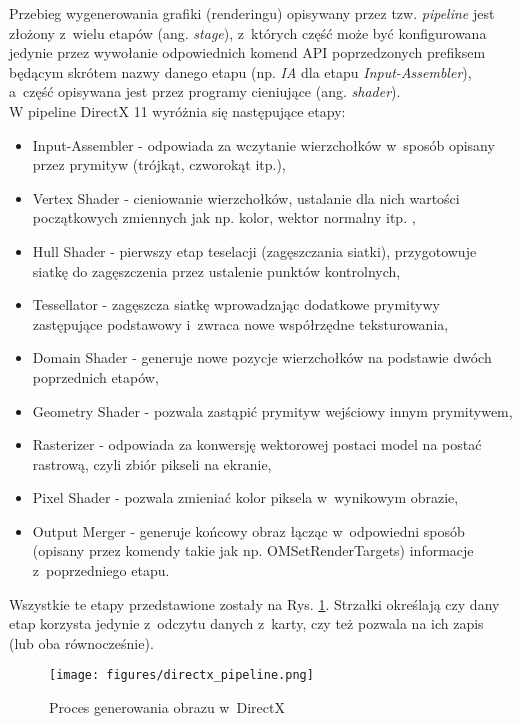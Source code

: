 Przebieg wygenerowania grafiki (renderingu) opisywany przez tzw. \emph{pipeline} jest złożony z~wielu etapów (ang. \emph{stage}), z~których część może być konfigurowana jedynie przez wywołanie odpowiednich komend API poprzedzonych prefiksem będącym skrótem nazwy danego etapu (np. \emph{IA} dla etapu \emph{Input-Assembler}), a~część opisywana jest przez programy cieniujące (ang. \emph{shader}).\\
W pipeline DirectX 11 wyróżnia się następujące etapy:
\begin{itemize}
\item Input-Assembler - odpowiada za wczytanie wierzchołków w~sposób opisany przez prymityw (trójkąt, czworokąt itp.),
\item Vertex Shader - cieniowanie wierzchołków, ustalanie dla nich wartości początkowych zmiennych jak np. kolor, wektor normalny itp. ,
\item Hull Shader - pierwszy etap teselacji (zagęszczania siatki), przygotowuje siatkę do zagęszczenia przez ustalenie punktów kontrolnych,
\item Tessellator - zagęszcza siatkę wprowadzając dodatkowe prymitywy zastępujące podstawowy i~zwraca nowe współrzędne teksturowania,
\item Domain Shader - generuje nowe pozycje wierzchołków na podstawie dwóch poprzednich etapów,
\item Geometry Shader - pozwala zastąpić prymityw wejściowy innym prymitywem,
\item Rasterizer - odpowiada za konwersję wektorowej postaci model na postać rastrową, czyli zbiór pikseli na ekranie,
\item Pixel Shader - pozwala zmieniać kolor piksela w~wynikowym obrazie,
\item Output Merger - generuje końcowy obraz łącząc w~odpowiedni sposób (opisany przez komendy takie jak np. OMSetRenderTargets) informacje z~poprzedniego etapu.
\end{itemize}

Wszystkie te etapy przedstawione zostały na Rys. \ref{directx_pipeline}. Strzałki określają czy dany etap korzysta jedynie z~odczytu danych z~karty, czy też pozwala na ich zapis (lub oba równocześnie).

\begin{figure}
\begin{center}
\texttt{[image: figures/directx\_pipeline.png]}
\caption{Proces generowania obrazu w~DirectX}
\label{directx_pipeline}
\end{center}
\end{figure}

